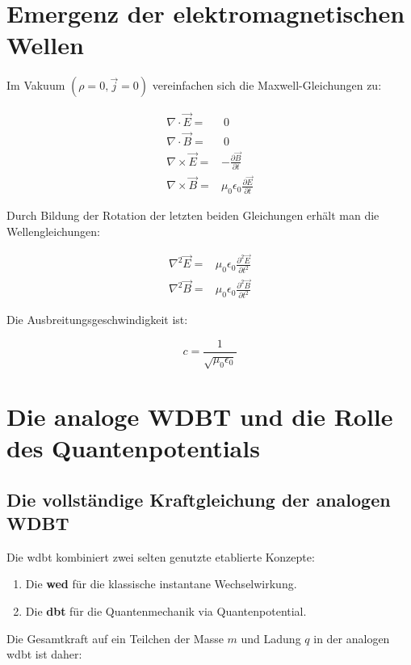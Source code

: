 \section{Emergenz der elektromagnetischen Wellen}
Im Vakuum $(\rho = 0, \vec{j} = 0)$ vereinfachen sich die Maxwell-Gleichungen zu:

\begin{align}
\nabla \cdot \vec{E} =&~0\\
\nabla \cdot \vec{B} =&~0\\
\nabla \times \vec{E} =& -\frac{\partial \vec{B}}{\partial t}\\
\nabla \times \vec{B} =& \mu_0 \epsilon_0 \frac{\partial \vec{E}}{\partial t}
\end{align}

Durch Bildung der Rotation der letzten beiden Gleichungen erhält man die Wellengleichungen:

\begin{align}
\nabla^2 \vec{E} =& \mu_0 \epsilon_0 \frac{\partial^2 \vec{E}}{\partial t^2}\\
\nabla^2 \vec{B} =& \mu_0 \epsilon_0 \frac{\partial^2 \vec{B}}{\partial t^2}
\end{align}

Die Ausbreitungsgeschwindigkeit ist:

\begin{equation}
    c = \frac{1}{\sqrt{\mu_0 \epsilon_0}}
\end{equation}

\newpage
\section{Die analoge WDBT und die Rolle des Quantenpotentials}
\subsection{Die vollständige Kraftgleichung der analogen WDBT}
Die \gls{wdbt} kombiniert zwei selten genutzte etablierte Konzepte:

\begin{enumerate}
    \item Die \textbf{\gls{wed}} für die klassische instantane Wechselwirkung.
    \item Die \textbf{\gls{dbt}} für die Quantenmechanik via Quantenpotential.
\end{enumerate}

Die Gesamtkraft auf ein Teilchen der Masse $m$ und Ladung $q$ in der analogen \gls{wdbt} ist daher:

